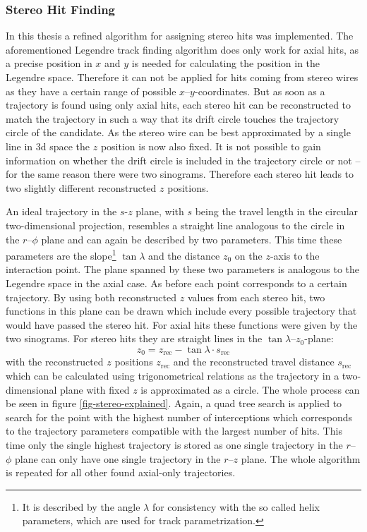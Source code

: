 \subsubsection{Stereo Hit Finding}

In this thesis a refined algorithm for assigning stereo hits was implemented. The aforementioned Legendre track finding algorithm does only work for axial hits, as a precise position in $x$ and $y$ is needed for calculating the position in the Legendre space. Therefore it can not be applied for hits coming from stereo wires as they have a certain range of possible $x$--$y$-coordinates. But as soon as a trajectory is found using only axial hits, each stereo hit can be reconstructed to match the trajectory in such a way that its drift circle touches the trajectory circle of the candidate. As the stereo wire can be best approximated by a single line in 3d space the $z$ position is now also fixed. It is not possible to gain information on whether the drift circle is included in the trajectory circle or not -- for the same reason there were two sinograms. Therefore each stereo hit leads to two slightly different reconstructed $z$ positions. 

An ideal trajectory in the $s$-$z$ plane, with $s$ being the travel length in the circular two-dimensional projection, resembles a straight line analogous to the circle in the $r$--$\phi$ plane and can again be described by two parameters. This time these parameters are the slope\footnote{It is described by the angle $\lambda$ for consistency with the so called helix parameters, which are used for track parametrization.} $\tan \lambda$ and the distance $z_0$ on the $z$-axis to the interaction point. The plane spanned by these two parameters is analogous to the Legendre space in the axial case. As before each point corresponds to a certain trajectory. By using both reconstructed $z$ values from each stereo hit, two functions in this plane can be drawn which include every possible trajectory that would have passed the stereo hit. For axial hits these functions were given by the two sinograms. For stereo hits they are straight lines in the $\tan \lambda$--$z_0$-plane:
$$ z_0 = z_\text{rec} - \tan \lambda \cdot s_\text{rec} $$
with the reconstructed $z$ positions $z_\text{rec}$ and the reconstructed travel distance $s_\text{rec}$ which can be calculated using trigonometrical relations as the trajectory in a two-dimensional plane with fixed $z$ is approximated as a circle. The whole process can be seen in figure \ref{fig-stereo-explained}. Again, a quad tree search is applied to search for the point with the highest number of interceptions which corresponds to the trajectory parameters compatible with the largest number of hits. This time only the single highest trajectory is stored as one single trajectory in the $r$--$\phi$ plane can only have one single trajectory in the $r$--$z$ plane. The whole algorithm is repeated for all other found axial-only trajectories. 


